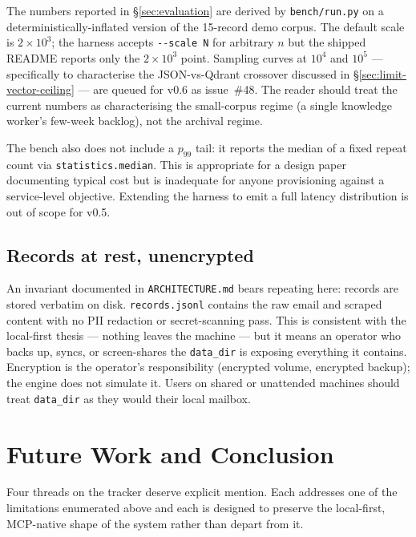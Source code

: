 The numbers reported in \S\ref{sec:evaluation} are derived by \texttt{bench/run.py} on a deterministically-inflated version of the 15-record demo corpus. The default scale is $2\times10^3$; the harness accepts \verb|--scale N| for arbitrary $n$ but the shipped README reports only the $2\times10^3$ point. Sampling curves at $10^4$ and $10^5$ --- specifically to characterise the JSON-vs-Qdrant crossover discussed in \S\ref{sec:limit-vector-ceiling} --- are queued for v0.6 as issue~\#48. The reader should treat the current numbers as characterising the small-corpus regime (a single knowledge worker's few-week backlog), not the archival regime.

The bench also does not include a $p_{99}$ tail: it reports the median of a fixed repeat count via \texttt{statistics.median}. This is appropriate for a design paper documenting typical cost but is inadequate for anyone provisioning against a service-level objective. Extending the harness to emit a full latency distribution is out of scope for v0.5.

\subsection{Records at rest, unencrypted}
\label{sec:limit-verbatim}

An invariant documented in \texttt{ARCHITECTURE.md} bears repeating here: records are stored verbatim on disk. \texttt{records.jsonl} contains the raw email and scraped content with no PII redaction or secret-scanning pass. This is consistent with the local-first thesis --- nothing leaves the machine --- but it means an operator who backs up, syncs, or screen-shares the \texttt{data\_dir} is exposing everything it contains. Encryption is the operator's responsibility (encrypted volume, encrypted backup); the engine does not simulate it. Users on shared or unattended machines should treat \texttt{data\_dir} as they would their local mailbox.

\section{Future Work and Conclusion}
\label{sec:future}

Four threads on the tracker deserve explicit mention. Each addresses one of the limitations enumerated above and each is designed to preserve the local-first, MCP-native shape of the system rather than depart from it.

